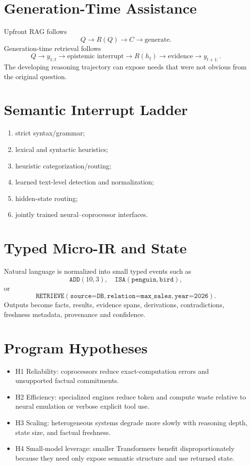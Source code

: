 \documentclass[11pt]{article}
\begin{document}
\section{Generation-Time Assistance}
Upfront RAG follows
\[
Q\rightarrow R(Q)\rightarrow C\rightarrow \text{generate}.
\]
Generation-time retrieval follows
\[
Q\rightarrow y_{1:t}\rightarrow \text{epistemic interrupt}\rightarrow R(h_t)\rightarrow \text{evidence}\rightarrow y_{t+1:}.
\]
The developing reasoning trajectory can expose needs that were not obvious from the original question.

\section{Semantic Interrupt Ladder}
\begin{enumerate}
\item strict syntax/grammar;
\item lexical and syntactic heuristics;
\item heuristic categorization/routing;
\item learned text-level detection and normalization;
\item hidden-state routing;
\item jointly trained neural--coprocessor interfaces.
\end{enumerate}

\section{Typed Micro-IR and State}
Natural language is normalized into small typed events such as
\[
\texttt{ADD}(10,3),\quad \texttt{ISA}(\texttt{penguin},\texttt{bird}),
\]
or
\[
\texttt{RETRIEVE}(\texttt{source=DB},\texttt{relation=max\_sales},\texttt{year=2026}).
\]
Outputs become facts, results, evidence spans, derivations, contradictions, freshness metadata, provenance and confidence.

\section{Program Hypotheses}
\begin{itemize}
\item H1 Reliability: coprocessors reduce exact-computation errors and unsupported factual commitments.
\item H2 Efficiency: specialized engines reduce token and compute waste relative to neural emulation or verbose explicit tool use.
\item H3 Scaling: heterogeneous systems degrade more slowly with reasoning depth, state size, and factual freshness.
\item H4 Small-model leverage: smaller Transformers benefit disproportionately because they need only expose semantic structure and use returned state.
\end{itemize}
\end{document}
